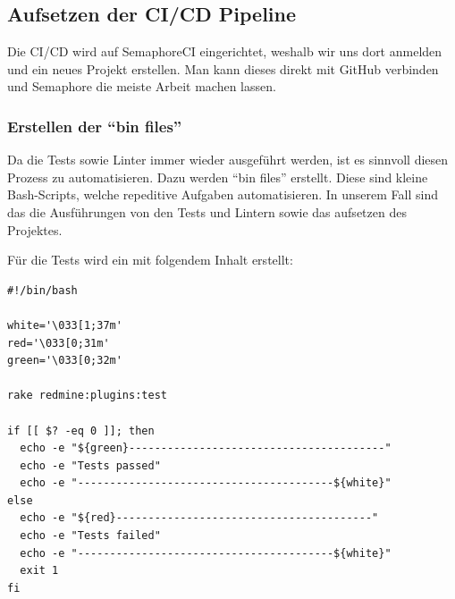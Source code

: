 \subsection{Aufsetzen der CI/CD Pipeline}
Die CI/CD wird auf SemaphoreCI eingerichtet, weshalb wir uns dort anmelden und ein neues Projekt erstellen. Man kann dieses
direkt mit GitHub verbinden und Semaphore die meiste Arbeit machen lassen.

\subsubsection{Erstellen der \enquote{bin files}}
Da die Tests sowie Linter immer wieder ausgeführt werden, ist es sinnvoll diesen Prozess zu automatisieren. Dazu werden 
\enquote{bin files} erstellt. Diese sind kleine Bash-Scripts, welche repeditive Aufgaben automatisieren. In unserem Fall sind
das die Ausführungen von den Tests und Lintern sowie das aufsetzen des Projektes. \newline

Für die Tests wird ein  mit folgendem Inhalt erstellt:
\begin{codebox}[]
  \begin{verbatim}
#!/bin/bash

white='\033[1;37m'
red='\033[0;31m'
green='\033[0;32m'

rake redmine:plugins:test

if [[ $? -eq 0 ]]; then
  echo -e "${green}----------------------------------------"
  echo -e "Tests passed"
  echo -e "----------------------------------------${white}"
else
  echo -e "${red}----------------------------------------"
  echo -e "Tests failed"
  echo -e "----------------------------------------${white}"
  exit 1
fi
  \end{verbatim}
\end{codebox}

